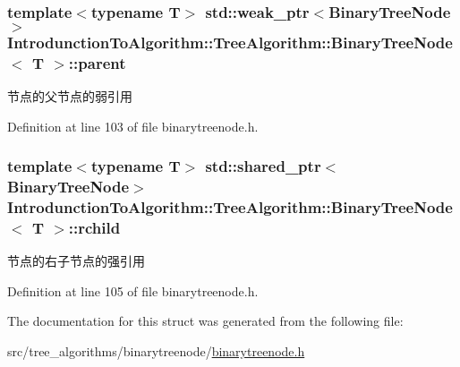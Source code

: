 \subsubsection[{parent}]{\setlength{\rightskip}{0pt plus 5cm}template$<$typename T$>$ std\+::weak\+\_\+ptr$<${\bf Binary\+Tree\+Node}$>$ {\bf Introdunction\+To\+Algorithm\+::\+Tree\+Algorithm\+::\+Binary\+Tree\+Node}$<$ T $>$\+::parent}\label{struct_introdunction_to_algorithm_1_1_tree_algorithm_1_1_binary_tree_node_afa42d2a3e68838d17d1028fab12c71e1}
节点的父节点的弱引用 

Definition at line 103 of file binarytreenode.\+h.

\hypertarget{struct_introdunction_to_algorithm_1_1_tree_algorithm_1_1_binary_tree_node_ae6dc3c9fce595c08cd3a31dba534fec3}{}
\subsubsection[{rchild}]{\setlength{\rightskip}{0pt plus 5cm}template$<$typename T$>$ std\+::shared\+\_\+ptr$<${\bf Binary\+Tree\+Node}$>$ {\bf Introdunction\+To\+Algorithm\+::\+Tree\+Algorithm\+::\+Binary\+Tree\+Node}$<$ T $>$\+::rchild}\label{struct_introdunction_to_algorithm_1_1_tree_algorithm_1_1_binary_tree_node_ae6dc3c9fce595c08cd3a31dba534fec3}
节点的右子节点的强引用 

Definition at line 105 of file binarytreenode.\+h.



The documentation for this struct was generated from the following file\+:\begin{DoxyCompactItemize}
\item 
src/tree\+\_\+algorithms/binarytreenode/\hyperlink{binarytreenode_8h}{binarytreenode.\+h}\end{DoxyCompactItemize}
